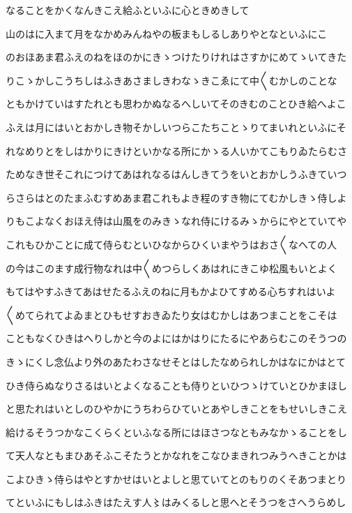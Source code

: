 \documentclass[a4paper,11pt,landscape]{ltjtarticle}
\begin{document}
なることをかくなんきこえ給ふといふに心ときめきして
\par\medskip
山のはに入まて月をなかめみんねやの板まもしるしありやとなといふにこ
\par\medskip
のおほあま君ふえのねをほのかにきゝつけたりけれはさすかにめてゝいてきた
\par\medskip
りこゝかしこうちしはふきあさましきわなゝきこゑにて中〱むかしのことな
\par\medskip
ともかけていはすたれとも思わかぬなるへしいてそのきむのことひき給へよこ
\par\medskip
ふえは月にはいとおかしき物そかしいつらこたちことゝりてまいれといふにそ
\par\medskip
れなめりとをしはかりにきけといかなる所にかゝる人いかてこもりゐたらむさ
\par\medskip
ためなき世そこれにつけてあはれなるはんしきてうをいとおかしうふきていつ
\par\medskip
らさらはとのたまふむすめあま君これもよき程のすき物にてむかしきゝ侍しよ
\par\medskip
りもこよなくおほえ侍は山風をのみきゝなれ侍にけるみゝからにやとていてや
\par\medskip
これもひかことに成て侍らむといひなからひくいまやうはおさ〱なへての人
\par\medskip
の今はこのます成行物なれは中〱めつらしくあはれにきこゆ松風もいとよく
\par\medskip
もてはやすふきてあはせたるふえのねに月もかよひてすめる心ちすれはいよ
\par\medskip
〱めてられてよゐまとひもせすおきゐたり女はむかしはあつまことをこそは
\par\medskip
こともなくひきはへりしかと今のよにはかはりにたるにやあらむこのそうつの
\par\medskip
きゝにくし念仏より外のあたわさなせそとはしたなめられしかはなにかはとて
\par\medskip
ひき侍らぬなりさるはいとよくなることも侍りといひつゝけていとひかまほし
\par\medskip
と思たれはいとしのひやかにうちわらひていとあやしきことをもせいしきこえ
\par\medskip
給けるそうつかなこくらくといふなる所にはほさつなともみなかゝることをし
\par\medskip
て天人なともまひあそふこそたうとかなれをこなひまきれつみうへきことかは
\par\medskip
こよひきゝ侍らはやとすかせはいとよしと思ていてとのもりのくそあつまとり
\par\medskip
てといふにもしはふきはたえす人〻はみくるしと思へとそうつをさへうらめし
\end{document}
